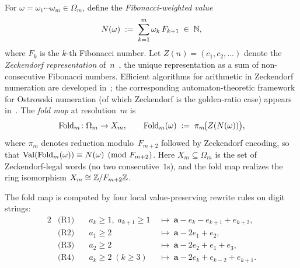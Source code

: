 \begin{definition}
\label{def:fold}
For $\omega = \omega_{1}\cdots\omega_{m} \in \Omega_{m}$, define
the \emph{Fibonacci-weighted value}
\[
  N(\omega) \;:=\; \sum_{k=1}^{m} \omega_{k}\, F_{k+1}
    \;\in\; \mathbb{N},
\]
where $F_{k}$ is the $k$-th Fibonacci number.
Let $Z(n) = (c_{1}, c_{2}, \ldots)$ denote the
\emph{Zeckendorf representation} of~$n$~\cite{Zeckendorf1972},
the unique representation as a sum of non-consecutive Fibonacci
numbers.  Efficient algorithms for arithmetic in Zeckendorf
numeration are developed in~\cite{AhlbachEtAl2013}; the
corresponding automaton-theoretic framework for Ostrowski
numeration (of which Zeckendorf is the golden-ratio case)
appears in~\cite{MorseHedlund1940}.  The \emph{fold map} at resolution~$m$ is
\[
  \operatorname{Fold}_{m} \colon \Omega_{m} \to X_{m},
  \qquad
  \operatorname{Fold}_{m}(\omega) \;:=\; \pi_{m}\!\bigl(Z(N(\omega))\bigr),
\]
where $\pi_{m}$ denotes reduction modulo~$F_{m+2}$
followed by Zeckendorf encoding, so that
$\operatorname{Val}(\operatorname{Fold}_{m}(\omega)) \equiv N(\omega) \pmod{F_{m+2}}$.
Here $X_{m} \subseteq \Omega_{m}$ is the set of Zeckendorf-legal
words (no two consecutive~$1$s), and the fold map realizes the
ring isomorphism $X_{m} \cong \mathbb{Z}/F_{m+2}\mathbb{Z}$.
\end{definition}

The fold map is computed by four local value-preserving rewrite
rules on digit strings:
\begin{alignat}{2}
  &\text{(R1)}& \quad a_{k} \ge 1,\; a_{k+1} \ge 1
    &\;\longmapsto\; \mathbf{a} - e_{k} - e_{k+1} + e_{k+2},
    \label{eq:R1}\\
  &\text{(R2)}& \quad a_{1} \ge 2
    &\;\longmapsto\; \mathbf{a} - 2e_{1} + e_{2},
    \label{eq:R2}\\
  &\text{(R3)}& \quad a_{2} \ge 2
    &\;\longmapsto\; \mathbf{a} - 2e_{2} + e_{1} + e_{3},
    \label{eq:R3}\\
  &\text{(R4)}& \quad a_{k} \ge 2\; (k \ge 3)
    &\;\longmapsto\; \mathbf{a} - 2e_{k} + e_{k-2} + e_{k+1}.
    \label{eq:R4}
\end{alignat}


